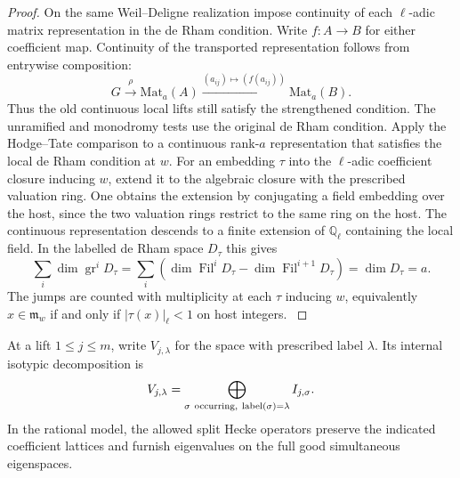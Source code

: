 \begin{proof}
On the same Weil--Deligne realization impose
continuity of each \(\ell\)-adic matrix representation in
the de Rham condition. Write \(f:A\to B\) for either coefficient map. Continuity of the transported representation follows from entrywise composition:
\[
 G\xrightarrow{\ \rho\ }\mathrm{Mat}_a(A)\xrightarrow{(a_{ij})\mapsto(f(a_{ij}))}\mathrm{Mat}_a(B).
\] Thus the old
continuous local lifts still satisfy the strengthened
condition. The unramified and monodromy tests use the
original de Rham condition. 
Apply the Hodge--Tate
comparison to a continuous rank-\(a\) representation
that satisfies the local de Rham condition at \(w\).
For an embedding \(\tau\) into the \(\ell\)-adic
coefficient closure inducing \(w\), extend it to the
algebraic closure with the prescribed valuation ring.
One obtains the extension by conjugating a field
embedding over the host, since the two valuation
rings restrict to the same ring on the host. The continuous
representation descends to a finite extension of \(\mathbb Q_\ell\)
containing the local field. In the labelled de Rham space \(D_\tau\) this gives
\[
 \sum_i\dim\operatorname{gr}^i D_\tau
 =\sum_i(\dim\operatorname{Fil}^i D_\tau-
               \dim\operatorname{Fil}^{i+1}D_\tau)=\dim D_\tau=a .
\]
The jumps are counted with multiplicity at each \(\tau\) inducing
\(w\), equivalently \(x\in\mathfrak m_w\) if and only if
\(|\tau(x)|_\ell<1\) on host integers. \label{cor:automorphic-realization-22}
\end{proof}

\begin{proposition}\label{prop:rational-row-isotypic-span}
At a lift \(1\le j\le m\), write \(V_{j,\lambda}\) for the space with prescribed label \(\lambda\). Its internal isotypic decomposition is
\[
 V_{j,\lambda}=\bigoplus_{\sigma\ {\rm occurring},\ {\rm label}(\sigma)=\lambda}I_{j,\sigma}.
\] In the rational
model, the allowed split Hecke operators preserve the
indicated coefficient lattices and furnish eigenvalues
on the full good simultaneous eigenspaces.
\end{proposition}


